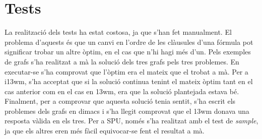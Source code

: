 \documentclass{article}
\begin{document}
\section{Tests}
La realització dels tests ha estat costosa, ja que s'han fet manualment. El  problema d'aquests és que un 
canvi en l'ordre de les clàusules d'una fórmula pot significar trobar un altre òptim, en el cas que n'hi hagi 
més d'un. Pels exemples de grafs s'ha realitzat a mà la solució dels tres grafs pels tres problemes. En executar-se
s'ha comprovat que l'òptim era el mateix que el trobat a mà.
Per a i13wm, s'ha acceptat que si la solució continua tenint el mateix òptim tant en el cas anterior com en el cas en 13wm, 
era que la solució plantejada estava bé. Finalment, per a comprovar que aquesta solució tenia sentit, s'ha escrit els problemes dels
grafs en dimacs i s'ha llegit comprovat que el 13wm donava una resposta vàlida en els tres. 
Per a SPU, només s'ha realitzat amb el test de \textit{sample}, ja que els altres eren més fàcil equivocar-se fent el resultat a mà.
\end{document}
